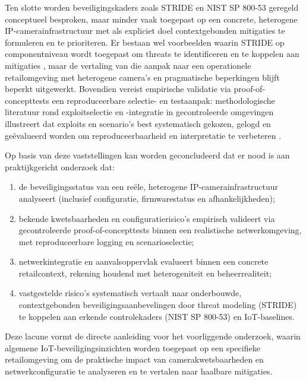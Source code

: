 Ten slotte worden beveiligingskaders zoals STRIDE en NIST SP 800-53 geregeld conceptueel besproken, maar minder vaak toegepast op een concrete, heterogene IP-camerainfrastructuur met als expliciet doel contextgebonden mitigaties te formuleren en te prioriteren. Er bestaan wel voorbeelden waarin STRIDE op componentniveau wordt toegepast om threats te identificeren en te koppelen aan mitigaties \autocite{khan2017stride}, maar de vertaling van die aanpak naar een operationele retailomgeving met heterogene camera’s en pragmatische beperkingen blijft beperkt uitgewerkt. Bovendien vereist empirische validatie via proof-of-concepttests een reproduceerbare selectie- en testaanpak: methodologische literatuur rond exploitselectie en -integratie in gecontroleerde omgevingen illustreert dat exploits en scenario’s best systematisch gekozen, gelogd en geëvalueerd worden om reproduceerbaarheid en interpretatie te verbeteren \autocite{FredrikssonLindkvist2024}.

Op basis van deze vaststellingen kan worden geconcludeerd dat er nood is aan praktijkgericht onderzoek dat:
\begin{enumerate}
    \item de beveiligingsstatus van een reële, heterogene IP-camerainfrastructuur analyseert (inclusief configuratie, firmwarestatus en afhankelijkheden);
    \item bekende kwetsbaarheden en configuratierisico’s empirisch valideert via gecontroleerde proof-of-concepttests binnen een realistische netwerkomgeving, met reproduceerbare logging en scenarioselectie;
    \item netwerkintegratie en aanvalsoppervlak evalueert binnen een concrete retailcontext, rekening houdend met heterogeniteit en beheerrealiteit;
    \item vastgestelde risico’s systematisch vertaalt naar onderbouwde, contextgebonden beveiligingsaanbevelingen door threat modeling (STRIDE) te koppelen aan erkende controlekaders (NIST SP 800-53) en IoT-baselines.
\end{enumerate}

Deze lacune vormt de directe aanleiding voor het voorliggende onderzoek, waarin algemene IoT-beveiligingsinzichten worden toegepast op een specifieke retailomgeving om de praktische impact van camerakwetsbaarheden en netwerkconfiguratie te analyseren en te vertalen naar haalbare mitigaties.
